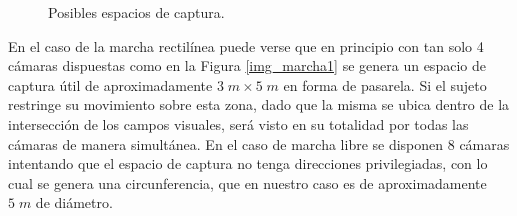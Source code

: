  
\begin{figure}[!ht]
  \centering
  \hspace{-1cm}
   \hspace{0.3cm}
     \caption{Posibles espacios de captura.}
  \label{img_espacio_capura}
\end{figure} 
 
En el caso de la marcha rectilínea puede verse que en principio con tan solo 4 cámaras dispuestas como en la Figura \ref{img_marcha1} se genera un espacio de captura útil de aproximadamente $3\;m\times5\; m$ en forma de pasarela. Si el sujeto restringe su movimiento sobre esta zona, dado que la misma se ubica dentro de la intersección de los campos visuales, será visto en su totalidad por todas las cámaras de manera simultánea. En el caso de marcha libre se disponen 8 cámaras intentando que el espacio de captura no tenga direcciones privilegiadas, con lo cual se genera una circunferencia, que en nuestro caso es de aproximadamente $5\;m$ de diámetro. 


